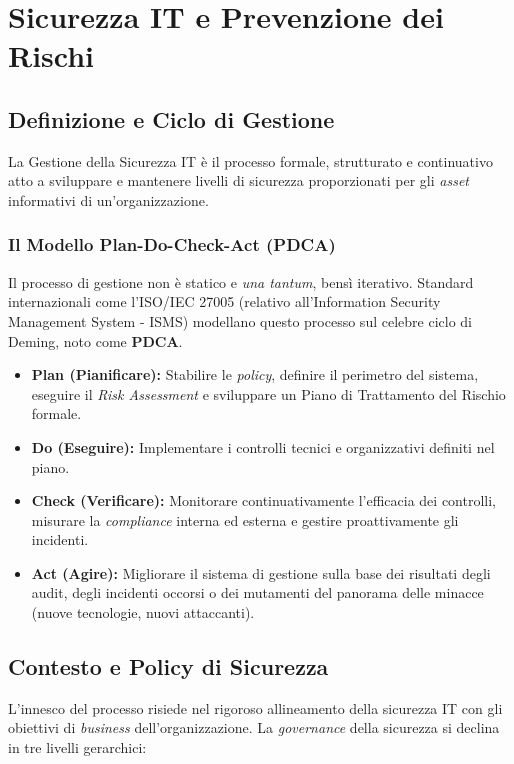 \chapter{Sicurezza IT e Prevenzione dei Rischi}

\section{Definizione e Ciclo di Gestione}
La Gestione della Sicurezza IT è il processo formale, strutturato e continuativo atto a sviluppare e mantenere livelli di sicurezza proporzionati per gli \textit{asset} informativi di un'organizzazione. 
\subsection{Il Modello Plan-Do-Check-Act (PDCA)}
Il processo di gestione non è statico e \textit{una tantum}, bensì iterativo. Standard internazionali come l'ISO/IEC 27005 (relativo all'Information Security Management System - ISMS) modellano questo processo sul celebre ciclo di Deming, noto come \textbf{PDCA}.

\begin{itemize}
    \item \textbf{Plan (Pianificare):} Stabilire le \textit{policy}, definire il perimetro del sistema, eseguire il \textit{Risk Assessment} e sviluppare un Piano di Trattamento del Rischio formale.
    \item \textbf{Do (Eseguire):} Implementare i controlli tecnici e organizzativi definiti nel piano.
    \item \textbf{Check (Verificare):} Monitorare continuativamente l'efficacia dei controlli, misurare la \textit{compliance} interna ed esterna e gestire proattivamente gli incidenti.
    \item \textbf{Act (Agire):} Migliorare il sistema di gestione sulla base dei risultati degli audit, degli incidenti occorsi o dei mutamenti del panorama delle minacce (nuove tecnologie, nuovi attaccanti).
\end{itemize}

\section{Contesto e Policy di Sicurezza}
L'innesco del processo risiede nel rigoroso allineamento della sicurezza IT con gli obiettivi di \textit{business} dell'organizzazione. La \textit{governance} della sicurezza si declina in tre livelli gerarchici:

